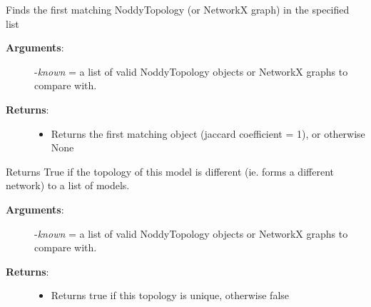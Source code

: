 \documentclass[a4paper,10pt,english]{sphinxmanual}
\begin{document}
\begin{fulllineitems}
\begin{fulllineitems}
\begin{description}
\begin{itemize}
\end{itemize}

\end{description}

\end{fulllineitems}


\begin{fulllineitems}
\label{pynoddy:pynoddy.output.NoddyTopology.find_matching}
Finds the first matching NoddyTopology (or NetworkX graph) in the specified list
\begin{description}
\item[{\textbf{Arguments}:}] \leavevmode
-\emph{known} = a list of valid NoddyTopology objects or NetworkX graphs to compare with.

\item[{\textbf{Returns}:}] \leavevmode\begin{itemize}
\item {} 
Returns the first matching object (jaccard coefficient = 1), or otherwise None

\end{itemize}

\end{description}

\end{fulllineitems}


\begin{fulllineitems}
\label{pynoddy:pynoddy.output.NoddyTopology.is_unique}
Returns True if the topology of this model is different (ie. forms a different network) to a list of models.
\begin{description}
\item[{\textbf{Arguments}:}] \leavevmode
-\emph{known} = a list of valid NoddyTopology objects or NetworkX graphs to compare with.

\item[{\textbf{Returns}:}] \leavevmode\begin{itemize}
\item {} 
Returns true if this topology is unique, otherwise false

\end{itemize}

\end{description}


\end{fulllineitems}
\end{fulllineitems}
\end{document}
